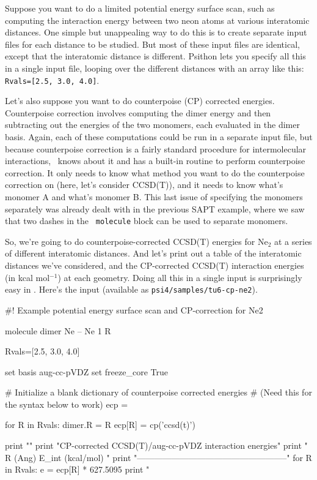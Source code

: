 Suppose you want to do a limited potential energy surface scan, such as
computing the interaction energy between two neon atoms at various
interatomic distances.  One simple but unappealing way to do this is to
create separate input files for each distance to be studied.  But most of
these input files are identical, except that the interatomic distance is
different.  Psithon lets you specify all this in a single input file,
looping over the different distances with an array like this: {\tt
Rvals=[2.5, 3.0, 4.0]}.

Let's also suppose you want to do counterpoise (CP) corrected energies.
Counterpoise correction involves computing the dimer energy and then
subtracting out the energies of the two monomers, each evaluated in the
dimer basis.  Again, each of these computations could be run in a separate
input file, but because counterpoise correction is a fairly standard
procedure for intermolecular interactions, \PSIfour\ knows about it and has
a built-in routine to perform counterpoise correction.  It only needs to
know what method you want to do the counterpoise correction on (here, let's
consider CCSD(T)), and it needs to know what's monomer A and what's monomer
B.  This last issue of specifying the monomers separately was already dealt
with in the previous SAPT example, where we saw that two dashes in the {\tt
molecule} block can be used to separate monomers.

So, we're going to do counterpoise-corrected CCSD(T) energies for Ne$_2$ at
a series of different interatomic distances.  And let's print out a table
of the interatomic distances we've considered, and the CP-corrected CCSD(T)
interaction energies (in kcal mol$^{-1}$) at each geometry.  Doing all this
in a single input is surprisingly easy in \PSIfour.  Here's the input
(available as {\tt psi4/samples/tu6-cp-ne2}).

\begin{Snippet}
#! Example potential energy surface scan and CP-correction for Ne2

molecule dimer {
  Ne
--
  Ne 1 R
}

Rvals=[2.5, 3.0, 4.0]

set basis aug-cc-pVDZ
set freeze_core True

# Initialize a blank dictionary of counterpoise corrected energies
# (Need this for the syntax below to work)
ecp = {}

for R in Rvals:
  dimer.R = R
  ecp[R] = cp('ccsd(t)')

print "\n"
print "CP-corrected CCSD(T)/aug-cc-pVDZ interaction energies\n\n"
print "        R (Ang)         E_int (kcal/mol)             \n"
print "-----------------------------------------------------\n"
for R in Rvals:
  e = ecp[R] * 627.5095
  print "        %
\end{Snippet}

